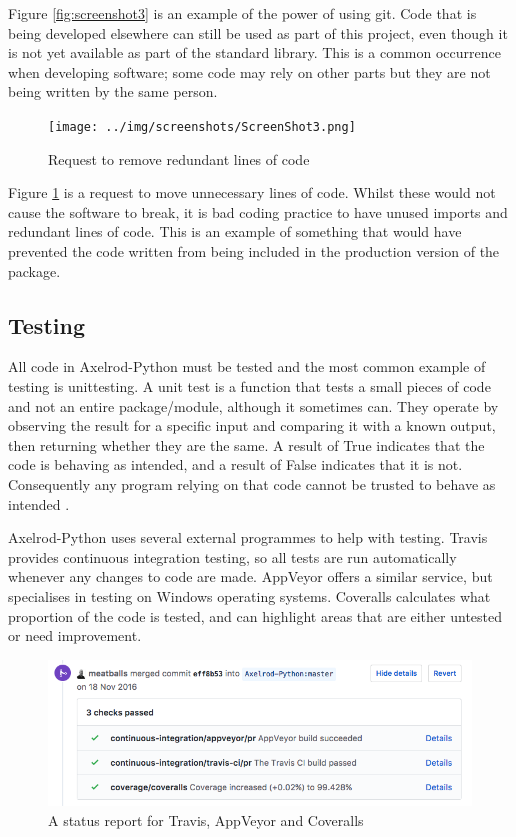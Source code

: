 Figure \ref{fig:screenshot3} is an example of the power of using git.
Code that is being developed elsewhere can still be used as part of this project, even though it is not yet available as part of the standard library.
This is a common occurrence when developing software; some code may rely on other parts but they are not being written by the same person.

\begin{figure}[htbp!]
\texttt{[image: ../img/screenshots/ScreenShot3.png]}
\caption{Request to remove redundant lines of code}
\label{fig:screenshot4}
\end{figure}

Figure \ref{fig:screenshot4} is a request to move unnecessary lines of code.
Whilst these would not cause the software to break, it is bad coding practice to have unused imports and redundant lines of code.
This is an example of something that would have prevented the code written from being included in the production version of the package.

\subsection{Testing}
All code in Axelrod-Python must be tested and the most common example of testing is unittesting.
A unit test is a function that tests a small pieces of code and not an entire package/module, although it sometimes can.
They operate by observing the result for a specific input and comparing it with a known output, then returning whether they are the same.
A result of True indicates that the code is behaving as intended, and a result of False indicates that it is not.
Consequently any program relying on that code cannot be trusted to behave as intended \cite{Sarma2016, Williams}.

Axelrod-Python uses several external programmes to help with testing.
Travis \cite{Travis} provides continuous integration testing, so all tests are run automatically whenever any changes to code are made.
AppVeyor \cite{AppVeyor} offers a similar service, but specialises in testing on Windows operating systems.
Coveralls \cite{Coveralls} calculates what proportion of the code is tested, and can highlight areas that are either untested or need improvement.

\begin{figure}[htbp!]
\includegraphics[width = \textwidth]{../img/screenshots/ScreenShot5.png}
\caption{A status report for Travis, AppVeyor and Coveralls}
\label{fig:screenshot5}
\end{figure}

